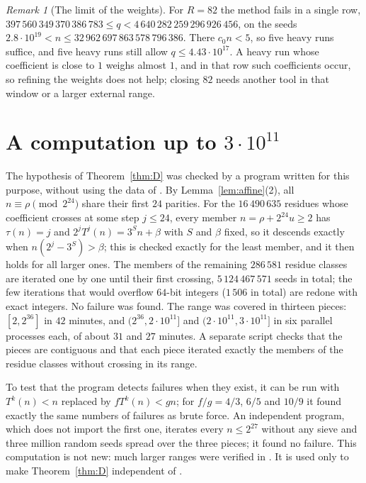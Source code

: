\documentclass[11pt]{amsart}
\theoremstyle{definition}
\theoremstyle{remark}
\newtheorem{remark}[theorem]{Remark}
\begin{document}
\begin{remark}[The limit of the weights]\label{rem:limit}
For $R=82$ the method fails in a single row, $397\,560\,349\,370\,386\,783\le q<4\,640\,282\,259\,296\,926\,456$, on the seeds $2.8\cdot10^{19}<n\le32\,962\,697\,863\,578\,796\,386$. There $c_0n<5$, so five heavy runs suffice, and five heavy runs still allow $q\le4.43\cdot10^{17}$. A heavy run whose coefficient is close to $1$ weighs almost $1$, and in that row such coefficients occur, so refining the weights does not help; closing $82$ needs another tool in that window or a larger external range.
\end{remark}

\section{A computation up to \texorpdfstring{$3\cdot10^{11}$}{3e11}}\label{sec:census}

The hypothesis of Theorem~\ref{thm:D} was checked by a program written for this purpose, without using the data of \cite{RT26}. By Lemma~\ref{lem:affine}(2), all $n\equiv\rho\pmod{2^{24}}$ share their first $24$ parities. For the $16\,490\,635$ residues whose coefficient crosses at some step $j\le24$, every member $n=\rho+2^{24}u\ge2$ has $\tau(n)=j$ and $2^{j}T^{j}(n)=3^{S}n+\beta$ with $S$ and $\beta$ fixed, so it descends exactly when $n(2^{j}-3^{S})>\beta$; this is checked exactly for the least member, and it then holds for all larger ones. The members of the remaining $286\,581$ residue classes are iterated one by one until their first crossing, $5\,124\,467\,571$ seeds in total; the few iterations that would overflow $64$-bit integers ($1\,506$ in total) are redone with exact integers. No failure was found. The range was covered in thirteen pieces: $[2,2^{36}]$ in $42$ minutes, and $(2^{36},2\cdot10^{11}]$ and $(2\cdot10^{11},3\cdot10^{11}]$ in six parallel processes each, of about $31$ and $27$ minutes. A separate script checks that the pieces are contiguous and that each piece iterated exactly the members of the residue classes without crossing in its range.

To test that the program detects failures when they exist, it can be run with $T^{k}(n)<n$ replaced by $fT^{k}(n)<gn$; for $f/g=4/3$, $6/5$ and $10/9$ it found exactly the same numbers of failures as brute force. An independent program, which does not import the first one, iterates every $n\le2^{27}$ without any sieve and three million random seeds spread over the three pieces; it found no failure. This computation is not new: much larger ranges were verified in \cite{RT26}. It is used only to make Theorem~\ref{thm:D} independent of \cite{RT26}.
\end{document}
